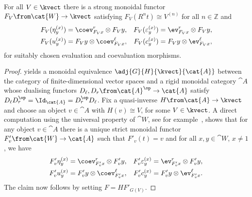 \begin{lemma}\label{lem:kassel-tangle-strong-mon-fun}
  For all \(V\in\kvect\) there is a strong monoidal functor \(F_V \from\cat{W} \to \kvect\) satisfying
  \(F_V(R^{n}t) \cong V^{(n)}\) for all \(n \in \mathbb{Z}\) and
  \begin{align*}
    F_{V}(\eta^{(x)}_{y}) &= \coev^r_{F_{V}x} \otimes F_{V}y,
    & F_{V}(\varepsilon^{(x)}_{y}) &=\ev^r_{F_{V}x}\otimes F_{V}y,\\
    F_{V}(u^{(x)}_{y}) &= F_{V}y \otimes \coev^{\ell}_{F_{V}x},
    & F_{V}(c^{(x)}_{y}) &= F_{V}y \otimes \ev^{\ell}_{F_{V}x},
  \end{align*}
  for suitably chosen evaluation and coevaluation morphisms.
\end{lemma}
\begin{proof}
   yields a monoidal equivalence \(\adj{G}{H}{\kvect}{\cat{A}}\)
  between the category of finite\hyp{}dimensional vector spaces and a rigid monoidal category \(\cat{A}\)
  whose dualising functors \(D_{\ell}, D_r \from \cat{A}^{\op}\to \cat{A}\) satisfy
  \(D_{\ell}D_r^{\op}=\Id_{\cat{A}}=D_r^{\op}D_{\ell}\).
  Fix a quasi-inverse \(H \from \cat{A} \to \kvect\) and choose an object \(v\in \cat{A}\) with \(H(v) \cong V\), for some \(V \in \kvect\).
  A direct computation using the universal property of \(\cat{W}\), see for example~\cite[Proposition~\textsc{xii}.1.4]{Kassel1998}, shows that
  for any object \(v\in \cat{A}\) there is a unique strict monoidal functor \(F'_{v}\from \cat{W}\to \cat{A}\) such that \(F'_{v}(t)=v\) and for all \(x,y\in \cat{W}\), \(x\neq 1\), we have
  \begin{align*}
    F'_{v}\eta^{(x)}_{y} &= \coev^r_{F'_{v}x} \otimes F'_{v}y, &
    F'_{v}\varepsilon^{(x)}_{y} &=\ev^r_{F'_{v}x}\otimes F'_{v}y,  \\
    F'_{v}u^{(x)}_{y} &= F'_{v}y \otimes \coev^{\ell}_{F'_{v}x}, &
    F'_{v}c^{(x)}_{y} &= F'_{v}y \otimes \ev^{\ell}_{F'_{v}x}.
  \end{align*}
  The claim now follows by setting \(F=HF'_{G(V)}\).
\end{proof}


